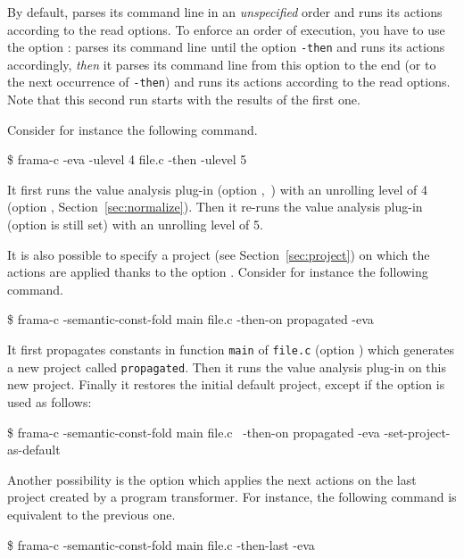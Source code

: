 By default, \FramaC parses its command line in an \emph{unspecified} order and
runs its actions according to the read options. To enforce an order of
execution, you have to use the option : \FramaC parses its
command line until the option \texttt{-then} and runs its actions accordingly,
\emph{then} it parses its command line from this option to the end (or to the
next occurrence of \texttt{-then}) and runs its actions according to the read
options. Note that this second run starts with the results of the first one.

Consider for instance the following command.
\begin{frama-c-commands}
\$ frama-c -eva -ulevel 4 file.c -then -ulevel 5
\end{frama-c-commands}
It first runs the value analysis plug-in (option
,~\cite{value}) with an unrolling level of 4 (option
, Section~\ref{sec:normalize}). Then it re-runs the value
analysis plug-in (option  is still set) with an unrolling
level of 5.

It is also possible to specify a project (see Section~\ref{sec:project}) on
which the actions are applied thanks to the option .
Consider for instance the following command.
\begin{frama-c-commands}
\$ frama-c -semantic-const-fold main file.c -then-on propagated -eva
\end{frama-c-commands}
It first propagates constants in function \texttt{main} of \texttt{file.c}
(option ) which generates a new project
called \texttt{propagated}. Then it runs the value analysis plug-in on this new
project. Finally it restores the initial default project, except if the option
 is used as follows:
\begin{frama-c-commands}
\$ frama-c -semantic-const-fold main file.c \
          -then-on propagated -eva -set-project-as-default
\end{frama-c-commands}

Another possibility is the option  which applies the
next actions on the last project created by a program transformer. For
instance, the following command is equivalent to the previous one.
\begin{frama-c-commands}
\$ frama-c -semantic-const-fold main file.c -then-last -eva
\end{frama-c-commands}

